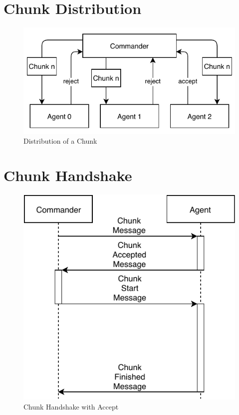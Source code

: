 \section{Chunk Distribution}
\begin{figure}[h]
	\begin{center}
	\includegraphics[scale=1]{Resources/PDF/ChunkDistribution}
	\caption{Distribution of a Chunk}
	\label{pic:ChunkDistribution}
	\end{center}
\end{figure}

\section{Chunk Handshake}
\begin{figure}[h]
	\begin{center}
	\includegraphics[scale=1]{Resources/PDF/ChunkAcceptedHandshake}
	\caption{Chunk Handshake with Accept}
	\label{pic:ChunkAcceptedHandshake}
	\end{center}
\end{figure}

